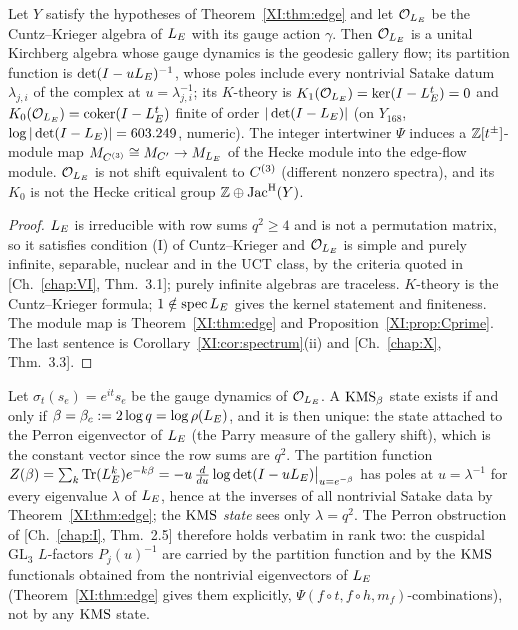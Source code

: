 \begin{theorem}\label{XI:thm:algebra}
Let $Y$ satisfy the hypotheses of Theorem~\ref{XI:thm:edge} and let $\mathcal{O}_{L_E}$ be the
Cuntz--Krieger algebra of $L_E$ with its gauge action $\gamma$. Then $\mathcal{O}_{L_E}$ is a unital
Kirchberg algebra whose gauge dynamics is the geodesic gallery flow; its partition
function is $\det(I-uL_E)^{-1}$, whose poles include every nontrivial Satake datum
$\lambda_{j,i}$ of the complex at $u=\lambda_{j,i}^{-1}$; its $K$-theory is
$K_1(\mathcal{O}_{L_E})=\ker(I-L_E^{t})=0$ and $K_0(\mathcal{O}_{L_E})=\operatorname{coker}(I-L_E^{t})$ finite of order
$|\det(I-L_E)|$ (on $Y_{168}$, $\log|\det(I-L_E)|=603.249$, numeric). The integer intertwiner
$\Psi$ induces a $\mathbb{Z}[t^{\pm}]$-module map $M_{C^{(3)}}\cong M_{C'}\to M_{L_E}$ of the Hecke
module into the edge-flow module. $\mathcal{O}_{L_E}$ is not shift equivalent to $C^{(3)}$ (different
nonzero spectra), and its $K_0$ is not the Hecke critical group $\mathbb{Z}\oplus\operatorname{Jac}^{\mathrm{H}}(Y)$.
\end{theorem}

\begin{proof}
$L_E$ is irreducible with row sums $q^{2}\ge4$ and is not a permutation matrix, so it
satisfies condition (I) of Cuntz--Krieger and $\mathcal{O}_{L_E}$ is simple and purely infinite,
separable, nuclear and in the UCT class, by the criteria quoted in [Ch.~\ref{chap:VI}, Thm.~3.1]; purely
infinite algebras are traceless. $K$-theory is the
Cuntz--Krieger formula; $1\notin\operatorname{spec}L_E$ gives the kernel statement and finiteness. The
module map is Theorem~\ref{XI:thm:edge} and Proposition~\ref{XI:prop:Cprime}. The last sentence is
Corollary~\ref{XI:cor:spectrum}(ii) and [Ch.~\ref{chap:X}, Thm.~3.3].
\end{proof}

\begin{proposition}\label{XI:prop:kms}
Let $\sigma_t(s_e)=e^{it}s_e$ be the gauge dynamics of $\mathcal{O}_{L_E}$. A $\mathrm{KMS}_\beta$ state exists
if and only if $\beta=\beta_c:=2\log q=\log\rho(L_E)$, and it is then unique: the state
attached to the Perron eigenvector of $L_E$ (the Parry measure of the gallery shift), which
is the constant vector since the row sums are $q^{2}$. The partition function
$Z(\beta)=\sum_k\operatorname{Tr}(L_E^{k})e^{-k\beta}=-u\,\frac{d}{du}\log\det(I-uL_E)\big|_{u=e^{-\beta}}$
has poles at $u=\lambda^{-1}$ for every eigenvalue $\lambda$ of $L_E$, hence at the inverses
of all nontrivial Satake data by Theorem~\ref{XI:thm:edge}; the $\mathrm{KMS}$ \emph{state} sees only
$\lambda=q^{2}$. The Perron obstruction of {\rm[Ch.~\ref{chap:I}, Thm.~2.5]} therefore holds verbatim in rank
two: the cuspidal $\mathrm{GL}_3$ $L$-factors $P_j(u)^{-1}$ are carried by the partition
function and by the $\mathrm{KMS}$ functionals obtained from the nontrivial eigenvectors of
$L_E$ (Theorem~\ref{XI:thm:edge} gives them explicitly, $\Psi(f\circ t,f\circ h,m_f)$-combinations),
not by any $\mathrm{KMS}$ state.
\end{proposition}

